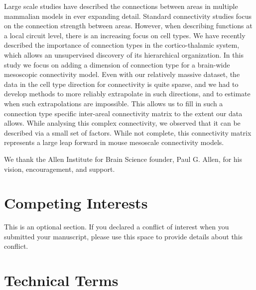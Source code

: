 \documentclass[NETN,manuscript]{stjour-new}
\begin{document}
\begin{authorsummary}
Large scale studies have described the connections between areas in multiple mammalian models in ever expanding detail. Standard connectivity studies focus on the connection strength between areas. However, when describing functions at a local circuit level, there is an increasing focus on cell types.  We have recently described the importance of connection types in the cortico-thalamic system, which allows an unsupervised discovery of its hierarchical organization. In this study we focus on adding a dimension of connection type for a brain-wide mesoscopic connectivity model. Even with our relatively massive dataset, the data in the cell type direction for connectivity is quite sparse, and we had to develop methods to more reliably extrapolate in such directions, and to estimate when such extrapolations are impossible. This allows us to fill in such a connection type specific inter-areal connectivity matrix to the extent our data allows. 
While analysing this complex connectivity, we observed that it can be described via a small set of factors. 
While not complete, this connectivity matrix represents a large leap forward in mouse mesoscale connectivity models. 
\end{authorsummary}

\newpage


\newpage

\newpage

\newpage


\newpage

\acknowledgments
We thank the Allen Institute for Brain Science founder, Paul G. Allen, for his vision, encouragement, and support.
\newpage


\newpage
\section{Competing Interests}
\label{sec:comp}
This is an optional section. If you declared a conflict of interest when you submitted your manuscript, please  use this space to provide details about this conflict.

\newpage


\newpage
\section{Technical Terms}
\end{document}
